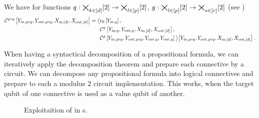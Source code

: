 \begin{lemma}
    We have for functions $q:\bigtimes_{k\in[d]}[2]\rightarrow\bigtimes_{l\in[p]}[2]$, $g:\bigtimes_{l\in[p]}[2]\rightarrow\bigtimes_{s\in[r]}[2]$ (see )
    \begin{align*}
        \mathcal{C}^{g\circ q}\left[Y_{\mathrm{in},g\circ q},Y_{\mathrm{out},g\circ q},X_{\mathrm{in},[d]},X_{\mathrm{out},[d]}\right]
        = \big\langle 
            &\epsilon_{0}\left[Y_{\mathrm{in},q}\right],\\
            &\mathcal{C}^{q}\left[Y_{\mathrm{in},q},Y_{\mathrm{out},q},X_{\mathrm{in},[d]},X_{\mathrm{out},[d]}\right],\\
            &\mathcal{C}^{g}\left[Y_{\mathrm{in},g\circ q},Y_{\mathrm{out},g\circ q},Y_{\mathrm{out},q},Y_{\mathrm{out},q}\right]
         \big\rangle \big[ 
            Y_{\mathrm{in},g\circ q},Y_{\mathrm{out},g\circ q},X_{\mathrm{in},[d]},X_{\mathrm{out},[d]}
         \big] \, .
    \end{align*}
\end{lemma}

When having a syntactical decomposition of a propositional formula, we can iteratively apply the \computationCircuit{} decomposition theorem and prepare each connective by a circuit.
We can decompose any propositional formula into logical connectives and prepare to each a modulus 2 circuit implementation.
This works, when the target qubit of one connective is used as a value qubit of another.

\begin{figure}
    \begin{center}
        
    \end{center}
    \caption{
        Exploitaition of \DecompositionSparsity{} in \computationCircuit{}s.
    }\label{fig:qcbencodingDecomposition}
\end{figure}


